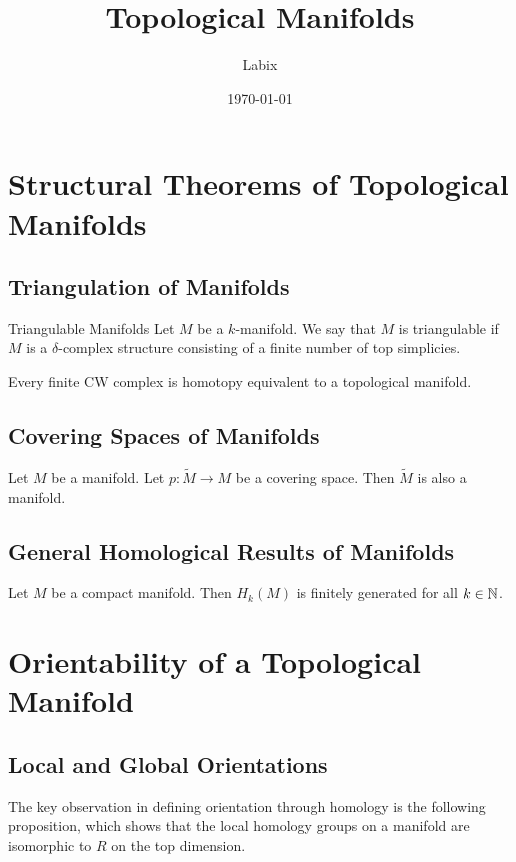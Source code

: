 \documentclass[a4paper]{article}
\title{Topological Manifolds}
\author{Labix}
\date{\today}
\begin{document}
\maketitle
\begin{abstract}
\end{abstract}
\pagebreak
\tableofcontents
\pagebreak

\section{Structural Theorems of Topological Manifolds}
\subsection{Triangulation of Manifolds}
\begin{defn}{Triangulable Manifolds}{} Let $M$ be a $k$-manifold. We say that $M$ is triangulable if $M$ is a $\delta$-complex structure consisting of a finite number of top simplicies. 
\end{defn}

\begin{prp}{}{} Every finite CW complex is homotopy equivalent to a topological manifold. 
\end{prp}

\subsection{Covering Spaces of Manifolds}
\begin{prp}{}{} Let $M$ be a manifold. Let $p:\tilde{M}\to M$ be a covering space. Then $\tilde{M}$ is also a manifold. 
\end{prp}

\subsection{General Homological Results of Manifolds}
\begin{prp}{}{} Let $M$ be a compact manifold. Then $H_k(M)$ is finitely generated for all $k\in\mathbb{N}$. 
\end{prp}

\pagebreak
\section{Orientability of a Topological Manifold}
\subsection{Local and Global Orientations}
The key observation in defining orientation through homology is the following proposition, which shows that the local homology groups on a manifold are isomorphic to $R$ on the top dimension. 
\end{document}
